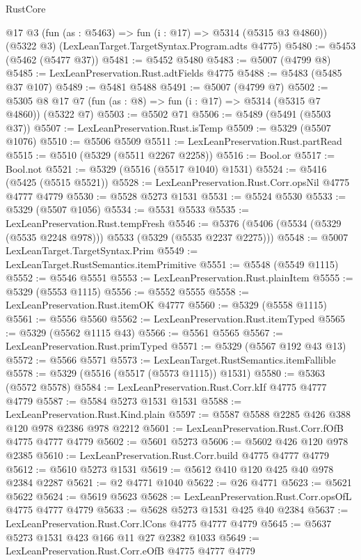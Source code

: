 \begin{lexlean}{RustCore}
\begin{coremodule}
    @17
    @3
    (fun (as : @5463) => fun (i : @17) => @5314 (@5315 @3 @4860))
    (@5322 @3)
    (LexLeanTarget.TargetSyntax.Program.adts @4775)
@5480 := @5453 (@5462 (@5477 @37))
@5481 := @5452 @5480
@5483 := @5007 (@4799 @8)
@5485 := LexLeanPreservation.Rust.adtFields @4775
@5488 := @5483 (@5485 @37 @107)
@5489 := @5481 @5488
@5491 := @5007 (@4799 @7)
@5502 := @5305 @8 @17 @7 (fun (as : @8) => fun (i : @17) => @5314 (@5315 @7 @4860)) (@5322 @7)
@5503 := @5502 @71
@5506 := @5489 (@5491 (@5503 @37))
@5507 := LexLeanPreservation.Rust.isTemp
@5509 := @5329 (@5507 @1076)
@5510 := @5506 @5509
@5511 := LexLeanPreservation.Rust.partRead
@5515 := @5510 (@5329 (@5511 @2267 @2258))
@5516 := Bool.or
@5517 := Bool.not
@5521 := @5329 (@5516 (@5517 @1040) @1531)
@5524 := @5416 (@5425 (@5515 @5521))
@5528 := LexLeanPreservation.Rust.Corr.opsNil @4775 @4777 @4779
@5530 := @5528 @5273 @1531
@5531 := @5524 @5530
@5533 := @5329 (@5507 @1056)
@5534 := @5531 @5533
@5535 := LexLeanPreservation.Rust.tempFresh
@5546 := @5376 (@5406 (@5534 (@5329 (@5535 @2248 @978))) @5533 (@5329 (@5535 @2237 @2275)))
@5548 := @5007 LexLeanTarget.TargetSyntax.Prim
@5549 := LexLeanTarget.RustSemantics.itemPrimitive
@5551 := @5548 (@5549 @1115)
@5552 := @5546 @5551
@5553 := LexLeanPreservation.Rust.plainItem
@5555 := @5329 (@5553 @1115)
@5556 := @5552 @5555
@5558 := LexLeanPreservation.Rust.itemOK @4777
@5560 := @5329 (@5558 @1115)
@5561 := @5556 @5560
@5562 := LexLeanPreservation.Rust.itemTyped
@5565 := @5329 (@5562 @1115 @43)
@5566 := @5561 @5565
@5567 := LexLeanPreservation.Rust.primTyped
@5571 := @5329 (@5567 @192 @43 @13)
@5572 := @5566 @5571
@5573 := LexLeanTarget.RustSemantics.itemFallible
@5578 := @5329 (@5516 (@5517 (@5573 @1115)) @1531)
@5580 := @5363 (@5572 @5578)
@5584 := LexLeanPreservation.Rust.Corr.kIf @4775 @4777 @4779
@5587 := @5584 @5273 @1531 @1531
@5588 := LexLeanPreservation.Rust.Kind.plain
@5597 := @5587 @5588 @2285 @426 @388 @120 @978 @2386 @978 @2212
@5601 := LexLeanPreservation.Rust.Corr.fOfB @4775 @4777 @4779
@5602 := @5601 @5273
@5606 := @5602 @426 @120 @978 @2385
@5610 := LexLeanPreservation.Rust.Corr.build @4775 @4777 @4779
@5612 := @5610 @5273 @1531
@5619 := @5612 @410 @120 @425 @40 @978 @2384 @2287
@5621 := @2 @4771 @1040
@5622 := @26 @4771
@5623 := @5621 @5622
@5624 := @5619 @5623
@5628 := LexLeanPreservation.Rust.Corr.opsOfL @4775 @4777 @4779
@5633 := @5628 @5273 @1531 @425 @40 @2384
@5637 := LexLeanPreservation.Rust.Corr.lCons @4775 @4777 @4779
@5645 := @5637 @5273 @1531 @423 @166 @11 @27 @2382 @1033
@5649 := LexLeanPreservation.Rust.Corr.eOfB @4775 @4777 @4779

\end{coremodule}
\end{lexlean}
